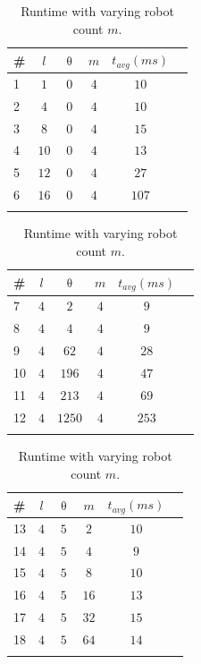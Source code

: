 \documentclass{svproc}
\begin{document}
\begin{table}[!htb]%
\begin{minipage}{.3\textwidth}
    \centering
    \begin{tabular}{|l|c|c|c|c|r|}
        \hline
         \#&$l$&$\uptheta$ &$m$&$t_{avg}(ms)$  \\ \hline
         1 & $1$ & $0$ & $4$ &$10$\\ \hline
         2 & $4$ & $0$ & $4$ & $10$\\ \hline
         3 & $8$ & $0$ & $4$ & $15$\\ \hline
         4 & $10$ & $0$ & $4$ & $13$ \\ \hline
         5 & $12$ & $0$ & $4$ & $27$ \\ \hline
         6 & $16$ & $0$ & $4$ & $107$ \\ \hline
         \multicolumn{5}{c}{}\\
    \end{tabular}
    \caption{Runtime with varying curve count $l$.}
    \label{tab:curveCountScalability}
\end{minipage}
\hfill
\begin{minipage}{.3\textwidth}
    \centering
    \begin{tabular}{|l|c|c|c|c|r|}
        \hline
         \#&$l$&$\uptheta$ &$m$&$t_{avg}(ms)$  \\ \hline
         7 & $4$ & $2$ & $4$ &$9$\\ \hline
         8 & $4$ & $4$ & $4$ & $9$ \\ \hline
         9 & $4$ & $62$ & $4$ & $28$ \\ \hline
         10 & $4$ & $196$ & $4$ & $47$  \\ \hline
         11 & $4$ & $213$ & $4$ & $69$  \\ \hline
         12 & $4$ & $1250$ & $4$ & $253$  \\ \hline
         \multicolumn{5}{c}{}\\
    \end{tabular}
    \caption{Runtime with varying occupied cells $\uptheta$.}
    \label{tab:obstacleCountScalability}
\end{minipage}
\hfill
\begin{minipage}{.3\textwidth}
    \centering
    \begin{tabular}{|l|c|c|c|c|r|}
        \hline
         \#&$l$&$\uptheta$ &$m$&$t_{avg}(ms)$  \\ \hline
         13 & $4$ & $5$ & $2$ &$10$\\ \hline
         14 & $4$ & $5$ & $4$ &$9$\\ \hline
         15 & $4$ & $5$ & $8$ & $10$ \\ \hline
         16 & $4$ & $5$ & $16$ & $13$ \\ \hline
         17 & $4$ & $5$ & $32$ & $15$  \\ \hline
         18 & $4$ & $5$ & $64$ & $14$  \\ \hline
         \multicolumn{5}{c}{}\\
    \end{tabular}
    \caption{Runtime with varying robot count $m$.}
    \label{tab:robotCountScalability}
\end{minipage}
\end{table}
\end{document}
